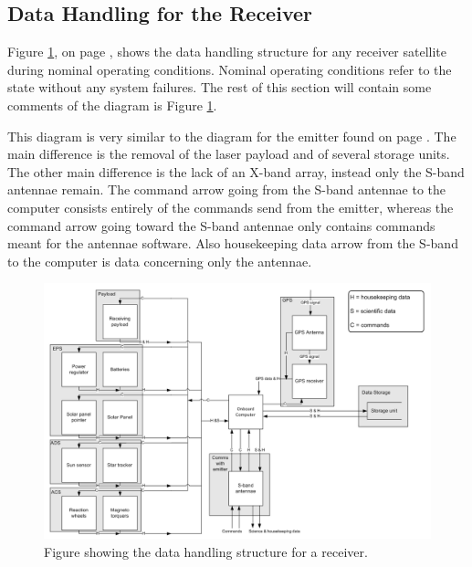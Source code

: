 \subsection{Data Handling for the Receiver}
\label{DataHandlingReceiver}

Figure \ref{fig:DHR}, on page \pageref{fig:DHR}, shows the data handling structure for any receiver satellite during nominal operating conditions. Nominal operating conditions refer to the state without any system failures. The rest of this section will contain some comments of the diagram is Figure \ref{fig:DHR}.

This diagram is very similar to the diagram for the emitter found on page \pageref{fig:DHE}. The main difference is the removal of the laser payload and of several storage units. The other main difference is the lack of an X-band array, instead only the S-band antennae remain. The command arrow going from the S-band antennae to the computer consists entirely of the commands send from the emitter, whereas the command arrow going toward the S-band antennae only contains commands meant for the antennae software. Also housekeeping data arrow from the S-band to the computer is data concerning only the antennae.

\begin{figure}
\centering
\includegraphics[width=1.0\textwidth, angle=90]{chapters/img/DHReceiver.png}
\caption{Figure showing the data handling structure for a receiver.}
\label{fig:DHR}
\end{figure}